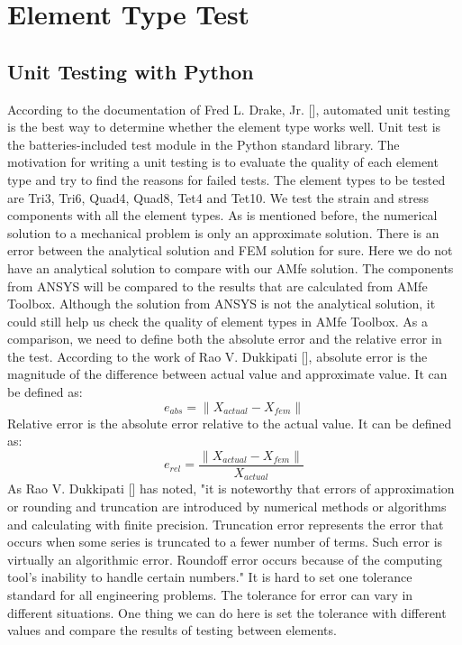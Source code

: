 \chapter{Element Type Test}
\section{Unit Testing with Python}
According to the documentation of Fred L. Drake, Jr. [\cite{Python}], automated unit testing is the best way to determine whether the element type works well. Unit test is the batteries-included test module in the Python standard library. The motivation for writing a unit testing is to evaluate the quality of each element type and try to find the reasons for failed tests. The element types to be tested are Tri3, Tri6, Quad4, Quad8, Tet4 and Tet10. We test the strain and stress components with all the element types. As is mentioned before, the numerical solution to a mechanical problem is only an approximate solution. There is an error between the analytical solution and FEM solution for sure. Here we do not have an analytical solution to compare with our AMfe solution. The components from ANSYS will be compared to the results that are calculated from AMfe Toolbox. Although the solution from ANSYS is not the analytical solution, it could still help us check the quality of element types in AMfe Toolbox. As a comparison, we need to define both the absolute error and the relative error in the test. According to the work of Rao V. Dukkipati [\cite{NumericalMethod}], absolute error is the magnitude of the difference between actual value and approximate value. It can be defined as:
\begin{equation}
e_{abs} = \|X_{actual} - X_{fem} \|
\end{equation}
Relative error is the absolute error relative to the actual value. It can be defined as:
\begin{equation}
e_{rel} = \frac{\|X_{actual} - X_{fem} \|}{X_{actual}}
\end{equation} 
As Rao V. Dukkipati [\cite{NumericalMethod}] has noted, "it is noteworthy that errors of approximation or rounding and truncation are introduced by numerical methods or algorithms and calculating with finite precision. Truncation error represents the error that occurs when some series is truncated to a fewer number of terms. Such error is virtually an algorithmic error. Roundoff error occurs because of the computing tool's inability to handle certain numbers." It is hard to set one tolerance standard for all engineering problems. The tolerance for error can vary in different situations. One thing we can do here is set the tolerance with different values and compare the results of testing between elements. 
